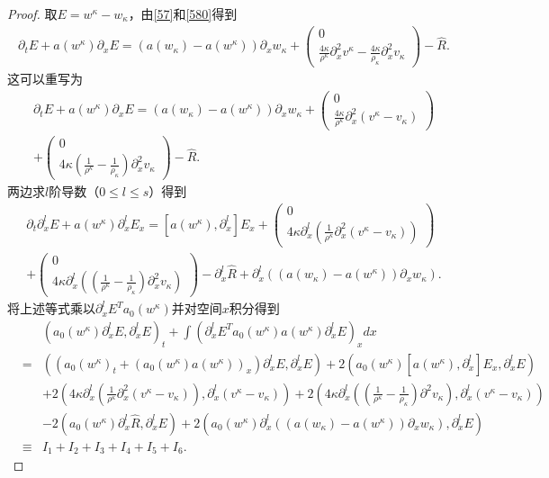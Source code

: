 \begin{proof}
取$E = w^\kappa - w_\kappa$，由\eqref{57}和\eqref{580}得到
\begin{eqnarray*}
  \partial_t E + a(w^\kappa) \partial_x E = (a(w_\kappa) - a(w^\kappa)) \partial_x w_\kappa + \left( \begin{array}{cc} 0 \\ \frac{4\kappa}{\rho^\kappa} \partial^2_x v^\kappa - \frac{4\kappa}{\rho_\kappa} \partial^2_x v_\kappa \end{array} \right) - \hat{R}.
\end{eqnarray*}
这可以重写为
\begin{eqnarray*}
   \partial_t E + a(w^\kappa) \partial_x E = (a(w_\kappa) - a(w^\kappa)) \partial_x w_\kappa + \left( \begin{array}{cc} 0 \\ \frac{4\kappa}{\rho^\kappa} \partial^2_x (v^\kappa - v_\kappa) \end{array} \right) \\
   + \left( \begin{array}{cc} 0 \\ 4\kappa(\frac{1}{\rho^\kappa} -\frac{1}{ \rho_\kappa})\partial^2_x v_\kappa \end{array} \right)- \hat{R}.
\end{eqnarray*}
两边求$l$阶导数（$0 \le l \le s$）得到
\begin{eqnarray*}
  \partial_t \partial^l_x E + a(w^\kappa) \partial^l_x E_x  = [a(w^\kappa),\partial^l_x] E_x  + \left( \begin{array}{cc} 0 \\4\kappa \partial^l_x(\frac{1}{\rho^\kappa} \partial^2_x (v^\kappa-v_\kappa)) \end{array} \right) \\  + \left( \begin{array}{cc} 0 \\ 4 \kappa \partial^l_x ((\frac{1}{\rho^\kappa} - \frac{1}{\rho_\kappa}) \partial^2_x v_\kappa) \end{array} \right) -\partial^l_x \hat{R} + \partial^l_x ((a(w_\kappa)-a(w^\kappa))\partial_x w_\kappa).
\end{eqnarray*}
将上述等式乘以$\partial^l_x E^Ta_0(w^\kappa)$并对空间$x$积分得到
\begin{eqnarray}\label{58}
&& (a_0(w^\kappa) \partial^l_x E,\partial^l_x E)_t + \int ( \partial^l_x E^T a_0(w^\kappa) a(w^\kappa) \partial^l_x E )_x dx \nonumber \\
&=&  ((a_0(w^\kappa)_t + (a_0(w^\kappa)a(w^\kappa))_x) \partial^l_x E,\partial^l_x E)
+ 2(a_0(w^\kappa)[a(w^\kappa),\partial^l_x] E_x,\partial^l_x E)\nonumber \\
&& + 2 (4\kappa \partial^l_x (\frac{1}{\rho^\kappa} \partial^2_x (v^\kappa-v_\kappa)),\partial^l_x (v^\kappa-v_\kappa)) + 2(4\kappa \partial^l_x ( (\frac{1}{\rho^\kappa}-\frac{1}{\rho_\kappa})\partial^2 v_\kappa),\partial^l_x (v^\kappa-v_\kappa)) \nonumber\\
&& - 2(a_0(w^\kappa)\partial^l_x\hat{R},\partial^l_x E)+ 2(a_0(w^\kappa)\partial^l_x((a(w_\kappa)-a(w^\kappa))\partial_x w_\kappa),\partial^l_x E) \nonumber \\
& \equiv& I_1 +I_2 +I_3 +I_4+I_5 + I_6.
\end{eqnarray}


\end{proof}
